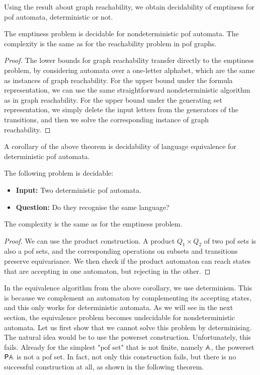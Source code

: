 Using the result about graph reachability, we obtain decidability of emptiness for pof automata, deterministic or not.
\begin{theorem}\label{thm:pof-emptiness-decidable}
    The emptiness problem is decidable for nondeterministic pof automata. The complexity is the same as for the reachability problem in pof graphs.
\end{theorem}
\begin{proof}
    The lower bounds for graph reachability transfer directly to the emptiness problem, by considering automata over a one-letter alphabet, which are the same as instances of graph reachability. For the upper bound under the  formula representation, we can use the same straightforward nondeterministic algorithm as in graph reachability. For the upper bound under the  generating set representation, we simply delete the input letters from the generators of the transitions, and then we solve the corresponding instance of graph reachability.
\end{proof}



A corollary of the above theorem is decidability of language equivalence for deterministic pof automata.
\begin{corollary}\label{cor:decidable-equivalence-for-pof-det}
    The following problem is decidable: 
    \begin{itemize}
        \item \textbf{Input:} Two deterministic pof automata.
        \item \textbf{Question:} Do they recognise the same language?
    \end{itemize}
    The complexity is the same as for the emptiness problem.
\end{corollary}
\begin{proof}
    We can use the product construction. A product $Q_1 \times Q_2$ of two pof sets is also a pof sets, and the corresponding operations on subsets and transitions preserve equivariance. We then check if the product automaton  can reach states that are accepting in one automaton, but rejecting in the other. 
\end{proof}

In the equivalence algorithm from the above corollary, we use determinism. This is because we complement an automaton by complementing its accepting states, and this only works for deterministic automata. As we will see in the next section,  the equivalence problem becomes undecidable for nondeterministic automata. Let us first show that we cannot solve this problem by determinising. The natural idea would be to use the powerset construction. Unfortunately, this fails. Already for the simplest "pof set" that is not finite, namely $\mathbb A$, the powerset ${\mathsf P} \mathbb A$ is not a pof set. In fact, not only this construction fails, but there is no successful construction at all, as shown in the following theorem. 

